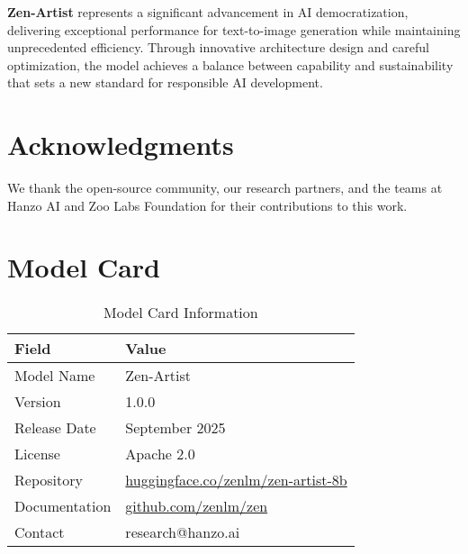 \documentclass[11pt,a4paper]{article}
\begin{document}
\textbf{Zen-Artist} represents a significant advancement in AI democratization, 
delivering exceptional performance for text-to-image generation while maintaining 
unprecedented efficiency. Through innovative architecture design and careful optimization, 
the model achieves a balance between capability and sustainability that sets a new standard 
for responsible AI development.

\section*{Acknowledgments}

We thank the open-source community, our research partners, and the teams at Hanzo AI and 
Zoo Labs Foundation for their contributions to this work.




\appendix

\section{Model Card}

\begin{table}[H]
\centering
\begin{tabular}{ll}
\toprule
\textbf{Field} & \textbf{Value} \\
\midrule
Model Name & Zen-Artist \\
Version & 1.0.0 \\
Release Date & September 2025 \\
License & Apache 2.0 \\
Repository & \href{https://huggingface.co/zenlm/zen-artist-8b}{huggingface.co/zenlm/zen-artist-8b} \\
Documentation & \href{https://github.com/zenlm/zen}{github.com/zenlm/zen} \\
Contact & research@hanzo.ai \\
\bottomrule
\end{tabular}
\caption{Model Card Information}
\end{table}
\end{document}

